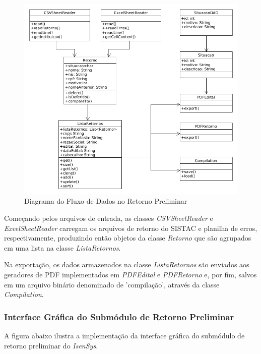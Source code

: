\documentclass[
	12pt,			%
	openright,		%
	oneside,	
	a4paper,		%
	english,		%
	brazil			%
]{abntex2/abntex2}  %
\begin{document}
	\begin{figure}[H]
		\begin{center}
			
			\caption{Diagrama do Fluxo de Dados no Retorno Preliminar}
			\label{preliminar-fluxo}
			
			\includegraphics[scale=0.5]{img/retorno-prelim-uml}
			
		\end{center}
	\end{figure}
	
	Começando pelos arquivos de entrada, as classes \textit{CSVSheetReader} e \textit{ExcelSheetReader} carregam os arquivos de retorno do SISTAC e planilha de erros, respectivamente, produzindo então objetos da classe \textit{Retorno} que são agrupados em uma lista na classe \textit{ListaRetornos}.
	
	Na exportação, os dados armazenados na classe \textit{ListaRetornos} são enviados aos geradores de PDF implementados em \textit{PDFEdital} e \textit{PDFRetorno} e, por fim, salvos em um arquivo binário denominado de 'compilação', através da classe \textit{Compilation}.
	
	\subsubsection{Interface Gráfica do Submódulo de Retorno Preliminar}
	
	A figura abaixo ilustra a implementação da interface gráfica do submódulo de retorno preliminar do \textit{IsenSys}.
	
\end{document}
